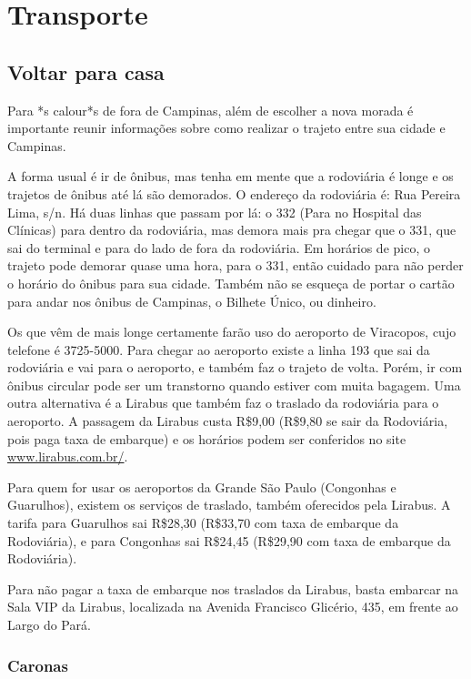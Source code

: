 
\section{Transporte}
\subsection{Voltar para casa}

Para *s calour*s de fora de Campinas, além de escolher a nova morada é
importante reunir informações sobre como realizar o trajeto entre sua cidade e
Campinas.

A forma usual é ir de ônibus, mas tenha em mente que a rodoviária é longe e os
trajetos de ônibus até lá são demorados. O endereço da rodoviária é: Rua Pereira
Lima, s/n. Há duas linhas que passam por lá: o 332 (Para no Hospital das Clínicas)
para dentro da rodoviária, mas demora mais pra chegar que o 331, que sai do
terminal e para do lado de fora da rodoviária. Em horários de pico, o trajeto
pode demorar quase uma hora, para o 331, então cuidado para não perder o horário 
do ônibus para sua cidade. Também não se esqueça de portar o cartão para andar nos
ônibus de Campinas, o Bilhete Único, ou dinheiro.

Os que vêm de mais longe certamente farão uso do aeroporto de Viracopos, cujo
telefone é 3725-5000. Para chegar ao aeroporto existe a linha 193 que sai da
rodoviária e vai para o aeroporto, e também faz o trajeto de volta. Porém, ir
com ônibus circular pode ser um transtorno quando estiver com muita bagagem. Uma
outra alternativa é a Lirabus que também faz o traslado da rodoviária para o
aeroporto. A passagem da Lirabus custa R\$9,00 (R\$9,80 se sair da Rodoviária,
pois paga taxa de embarque) e os horários podem ser conferidos no site
\url{www.lirabus.com.br/}.

Para quem for usar os aeroportos da Grande São Paulo (Congonhas e Guarulhos),
existem os serviços de traslado, também oferecidos pela Lirabus. A tarifa para
Guarulhos sai R\$28,30 (R\$33,70 com taxa de embarque da Rodoviária), e para
Congonhas sai R\$24,45 (R\$29,90 com taxa de embarque da Rodoviária).

Para não pagar a taxa de embarque nos traslados da Lirabus, basta embarcar na
Sala VIP da Lirabus, localizada na Avenida Francisco Glicério, 435, em frente ao
Largo do Pará.

\subsubsection{Caronas}

